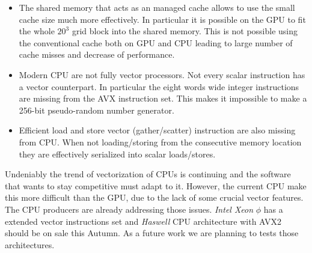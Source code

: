 \documentclass[a4paper]{llncs}
\begin{document}
\begin{itemize}
\item The shared memory that acts as an managed cache allows to use
  the small cache size much more effectively. In particular it is
  possible on the GPU to fit the whole $20^3$ grid block into the
  shared memory. This is not possible using the conventional cache
  both on GPU and CPU leading to large number of cache misses and
  decrease of performance.
\item Modern CPU are not fully vector processors. Not every scalar
  instruction has a vector counterpart. In particular the eight words
  wide integer instructions are missing from the AVX instruction set.
  This makes it impossible to make a 256-bit pseudo-random number
  generator.
\item Efficient load and store vector (gather/scatter) instruction are
  also missing from CPU.  When not loading/storing from the
  consecutive memory location they are effectively serialized into
  scalar loads/stores.
\end{itemize}

Undeniably the trend of vectorization of CPUs is continuing and the software
that wants to stay competitive must adapt to it. However, the current CPU make
this more difficult than the GPU, due to the lack of some crucial vector
features. The CPU producers are already addressing those issues. \emph{Intel
Xeon} $\phi$ has a extended vector instructions set and \emph{Haswell} CPU
architecture with AVX2 should be on sale this Autumn. As a future work we are
planning to tests those architectures.

\end{document}
